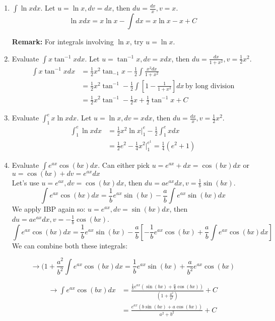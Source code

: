 \documentclass[11pt]{article}
\theoremstyle{plain}
\theoremstyle{remark}
\theoremstyle{plain}
\newcommand{\bd}{\textbf}
\begin{document}
\begin{tcolorbox}[colback=magenta!5!white,colframe=magenta!75!black,title=Example]
    \begin{enumerate}
        \item $\int\ln xdx$. Let $u=\ln x, dv=dx$, then $du=\frac{dx}{x}, v=x$.
        \[\ln xdx =x\ln x-\int dx = x\ln x-x+C\]

        \bd{Remark:} For integrals involving $\ln x$, try $u=\ln x$.

        \item Evaluate $\int x\tan^{-1}xdx$. Let $u=\tan^{-1}x, dv=xdx$, then $du=\frac{dx}{1+x^2}, v=\frac{1}{2}x^2$.
        \begin{align*}
            \int x \tan^{-1}xdx&=\frac{1}{2}x^2\tan_{-1}x-\frac{1}{2}\int\frac{x^2dx}{1+x^2}\\
            &=\frac{1}{2}x^2\tan^{-1}-\frac{1}{2}\int[1-\frac{1}{1+x^2}]dx \,\text{by long division}\\
            &=\frac{1}{2}x^2\tan^{-1}-\frac{1}{2}x+\frac{1}{2}\tan^{-1}x+C
        \end{align*}

        \item Evaluate $\int_1^ex\ln xdx$. Let $u=\ln x, dv=xdx$, then $du=\frac{dx}{x}, v=\frac{1}{2}x^2$.
        \begin{align*}
            \int_1^e\ln xdx&=\frac{1}{2}x^2\ln x\Big|_1^e-\frac{1}{2}\int_1^exdx\\
            &=\frac{1}{2}e^2-\frac{1}{4}x^2|_1^{e^1}=\frac{1}{4}(e^2+1)
        \end{align*}

        \item Evaluate $\int e^{ax}\cos(bx)dx$. Can either pick $u=e^{ax}+dx=\cos(bx)dx$ or $u=\cos(bx)+dv=e^{ax}dx$\\
        Let's use $u=e^{ax}, dv=\cos(bx)dx$, then $du=ae^{ax}dx, v=\frac{1}{b}\sin(bx)$.
        \[\int e^{ax}\cos(bx)dx=\frac{1}{b}e^{ax}\sin(bx)-\frac{a}{b}\int e^{ax}\sin(bx)dx\]
        We apply IBP again so: $u=e^{ax}, dv=\sin(bx)dx$, then $du=ae^{ax}dx, v=-\frac{1}{b}\cos(bx)$.
        \[\int e^{ax}\cos(bx)dx=\frac{1}{b}e^{ax}\sin(bx)-\frac{a}{b}[-\frac{1}{b}e^{ax}\cos(bx)+\frac{a}{b}\int e^{ax}\cos(bx)dx]\]
        We can combine both these integrals:
        
        \[\rightarrow (1+\frac{a^2}{b^2}\int e^{ax}\cos(bx)dx=\frac{1}{b}e^{ax}\sin(bx)+\frac{a}{b^2}e^{ax}\cos(bx)\]
        
        \begin{align*}
            \rightarrow \int e^{ax}\cos(bx)dx&=\frac{\frac{1}{b}e^{ax}(\sin(bx)+\frac{a}{b}\cos(bx))}{(1+\frac{a^2}{b^2})}+C\\
            &=\frac{e^{ax}(b\sin(bx)+a\cos(bx))}{a^2+b^2}+C
        \end{align*}
    \end{enumerate}
 \end{tcolorbox}   
\end{document}
